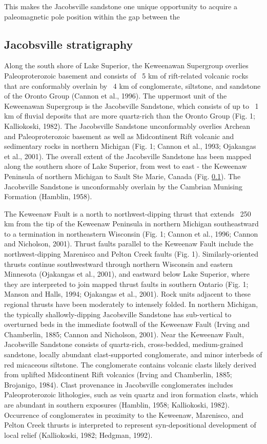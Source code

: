 \documentclass[draft]{agujournal2019}
\begin{document}
This makes the Jacobsville sandstone one unique opportunity to acquire a paleomagnetic pole position within the gap between the 

\subsection{Jacobsville stratigraphy}

Along the south shore of Lake Superior, the Keweenawan Supergroup overlies Paleoproterozoic basement and consists of ~5 km of rift-related volcanic rocks that are conformably overlain by ~4 km of conglomerate, siltstone, and sandstone of the Oronto Group (Cannon et al., 1996). The uppermost unit of the Keweenawan Supergroup is the Jacobsville Sandstone, which consists of up to ~1 km of fluvial deposits that are more quartz-rich than the Oronto Group (Fig. 1; Kalliokoski, 1982). The Jacobsville Sandstone unconformably overlies Archean and Paleoproterozoic basement as well as Midcontinent Rift volcanic and sedimentary rocks in northern Michigan (Fig. 1; Cannon et al., 1993; Ojakangas et al., 2001). The overall extent of the Jacobsville Sandstone has been mapped along the southern shore of Lake Superior, from west to east - the Keweenaw Peninsula of northern Michigan to Sault Ste Marie, Canada (Fig. \ref{}). The Jacobsville Sandstone is unconformably overlain by the Cambrian Munising Formation (Hamblin, 1958).

The Keweenaw Fault is a north to northwest-dipping thrust that extends ~250 km from the tip of the Keweenaw Peninsula in northern Michigan southeastward to a termination in northeastern Wisconsin (Fig. 1; Cannon et al., 1996; Cannon and Nicholson, 2001). Thrust faults parallel to the Keweenaw Fault include the northwest-dipping Marenisco and Pelton Creek faults (Fig. 1). Similarly-oriented thrusts continue southwestward through northern Wisconsin and eastern Minnesota (Ojakangas et al., 2001), and eastward below Lake Superior, where they are interpreted to join mapped thrust faults in southern Ontario (Fig. 1; Manson and Halls, 1994; Ojakangas et al., 2001). Rock units adjacent to these regional thrusts have been moderately to intensely folded. In northern Michigan, the typically shallowly-dipping Jacobsville Sandstone has sub-vertical to overturned beds in the immediate footwall of the Keweenaw Fault (Irving and Chamberlin, 1885; Cannon and Nicholson, 2001). Near the Keweenaw Fault, Jacobsville Sandstone consists of quartz-rich, cross-bedded, medium-grained sandstone, locally abundant clast-supported conglomerate, and minor interbeds of red micaceous siltstone. The conglomerate contains volcanic clasts likely derived from uplifted Midcontinent Rift volcanics (Irving and Chamberlin, 1885; Brojanigo, 1984). Clast provenance in Jacobsville conglomerates includes Paleoproterozoic lithologies, such as vein quartz and iron formation clasts, which are abundant in southern exposures (Hamblin, 1958; Kalliokoski, 1982). Occurrence of conglomerates in proximity to the Keweenaw, Marenisco, and Pelton Creek thrusts is interpreted to represent syn-depositional development of local relief (Kalliokoski, 1982; Hedgman, 1992). 
\end{document}

